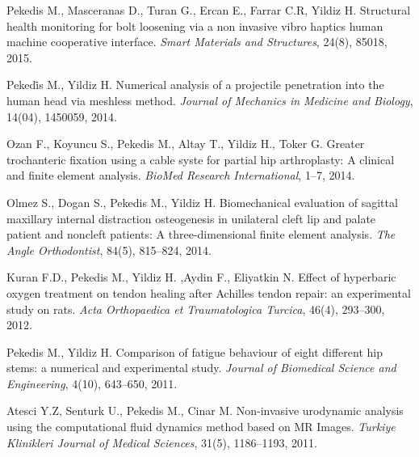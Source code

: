 \documentclass[10pt]{article}
\begin{document}
\begin{bibenum}
	\item Pekedis M., Masceranas D., Turan G., Ercan E., Farrar C.R, Yildiz H. Structural health monitoring for bolt
		 loosening via a non invasive vibro haptics human machine cooperative interface. 
		 \emph{Smart Materials and Structures}, 24(8), 85018, 2015.
		 
	\item Pekedi̇s M., Yildiz H. Numerical analysis of a projectile penetration
		into the human head via meshless method.
		\emph{Journal of Mechanics in Medicine and Biology}, 14(04), 1450059, 2014.
		
	\item Ozan F., Koyuncu S., Pekedis M., Altay T., Yildiz H., Toker G. Greater trochanteric
		fixation using a cable syste for partial hip arthroplasty: 
		A clinical and finite element analysis. 
		\emph{BioMed Research International}, 1--7, 2014.\\
		
	\item Olmez S., Dogan S., Pekedis M., Yildiz H. Biomechanical evaluation of sagittal maxillary internal distraction osteogenesis
		 in unilateral cleft lip and palate patient and noncleft patients: A three-dimensional finite element analysis.
		 \emph{The Angle Orthodontist}, 84(5), 815--824, 2014.
		 
	
	\item Kuran F.D., Pekedis M., Yildiz H. ,Aydin F., Eliyatkin N. 	Effect of hyperbaric oxygen treatment on
		tendon healing after Achilles tendon repair: an experimental study on rats. 
		\emph{Acta Orthopaedica et Traumatologica Turcica}, 46(4), 293--300, 2012.
		
	\item Pekedis M., Yildiz H. Comparison of fatigue behaviour of eight different hip stems: a numerical and experimental study. 
		\emph{Journal of Biomedical Science and Engineering}, 4(10), 643--650, 2011.

	\item Atesci Y.Z, Senturk U., Pekedis M., Cinar M. Non-invasive urodynamic analysis using the computational fluid dynamics 
		method based on MR Images. 
		\emph{Turkiye Klinikleri Journal of Medical Sciences}, 31(5), 1186--1193, 2011.\\
	

\end{bibenum}
\end{document}

